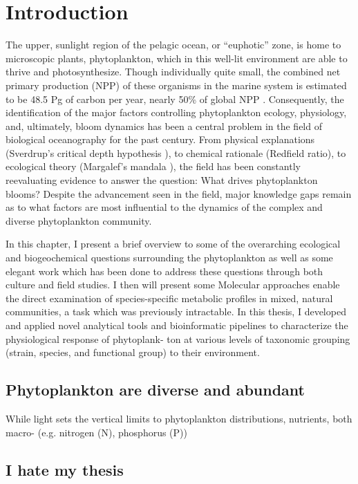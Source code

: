 
\chapter{Introduction}
\raggedbottom

The upper, sunlight region of the pelagic ocean, or ``euphotic'' zone, is home to microscopic plants, phytoplankton, which in this well-lit environment are able to thrive and photosynthesize. Though individually quite small, the combined net primary production (NPP) of these organisms in the marine system is estimated to be 48.5 Pg of carbon per year, nearly 50\% of global NPP \citep{Field1998}. Consequently, the identification of the major factors controlling phytoplankton ecology, physiology, and, ultimately, bloom dynamics has been a central problem in the field of biological oceanography for the past century. From physical explanations (Sverdrup's critical depth hypothesis \citep{Sverdrup1953}), to chemical rationale (Redfield ratio\citep{Redfield1958}), to ecological theory (Margalef's mandala \citep{Margalef1978}), the field has been constantly reevaluating evidence to answer the question: What drives phytoplankton blooms? Despite the advancement seen in the field, major knowledge gaps remain as to what factors are most influential to the dynamics of the complex and diverse phytoplankton community. \citep{Iglesias-Rodriguez2008}


In this chapter, I present a brief overview to some of the overarching ecological and biogeochemical questions surrounding the phytoplankton as well as some elegant work which has been done to address these questions through both culture and field studies. I then will present some 
Molecular approaches enable the direct examination of species-specific metabolic profiles in mixed, natural communities, a task which was previously intractable. In this thesis, I developed and applied novel analytical tools and bioinformatic pipelines to characterize the physiological response of phytoplank- ton at various levels of taxonomic grouping (strain, species, and functional group) to their environment.

\section{Phytoplankton are diverse and abundant}
While light sets the vertical limits to phytoplankton distributions, nutrients, both macro- (e.g. nitrogen (N), phosphorus (P)) 
\section{I hate my thesis}

